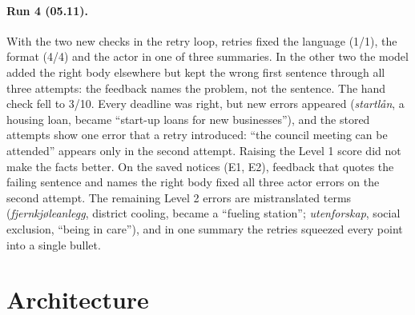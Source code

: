 \documentclass{article}
\begin{document}
\paragraph{Run 4 (05.11).} With the two new checks in the retry loop, retries fixed the language (1/1),
the format (4/4) and the actor in one of three summaries. In the other two the model added the right
body elsewhere but kept the wrong first sentence through all three attempts: the feedback names the
problem, not the sentence. The hand check fell to 3/10. Every deadline was right, but new errors
appeared (\emph{startlån}, a housing loan, became ``start-up loans for new businesses''), and the stored
attempts show one error that a retry introduced: ``the council meeting can be attended'' appears only
in the second attempt. Raising the Level 1 score did not make the facts better. On the saved notices (E1, E2), feedback that
quotes the failing sentence and names the right body fixed all three actor errors on the second attempt.
The remaining Level 2 errors are mistranslated terms (\emph{fjernkjøleanlegg}, district cooling, became a
``fueling station''; \emph{utenforskap}, social exclusion, ``being in care''), and in one summary the
retries squeezed every point into a single bullet.

\section{Architecture}
\label{sec:arch}
\end{document}
